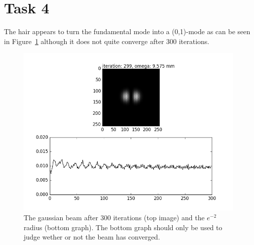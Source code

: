 \documentclass[12pt,a4paper]{article}
\begin{document}
\section{Task 4}\label{sec:4}
The hair appears to turn the fundamental mode into a (0,1)-mode as can be seen in Figure~\ref{fig:task4} although it does not quite converge after 300 iterations.
\begin{figure}
  \centering
  \includegraphics[width=\textwidth]{4_gauss_1_0.png}
  \caption{The gaussian beam after 300 iterations (top image) and the $e^{-2}$ radius (bottom graph). The bottom graph should only be used to judge wether or not the beam has converged.}
  \label{fig:task4}
\end{figure}
\end{document}

